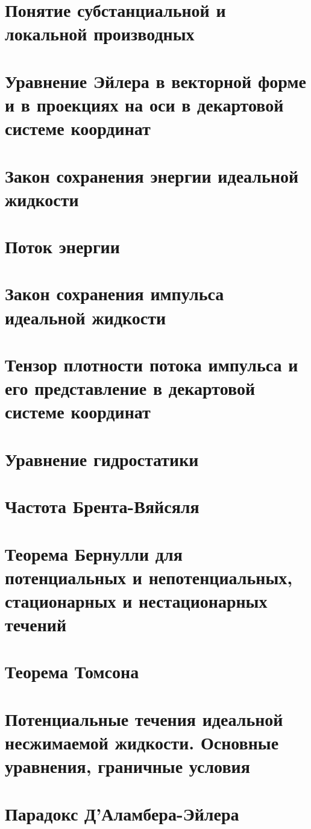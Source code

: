 \documentclass[10pt,landscape,a4paper]{article}
\begin{document}
	\small
	\begin{multicols*}{5}
		\section{Понятие субстанциальной и локальной производных}
		\section{Уравнение Эйлера в векторной форме и в проекциях на оси в декартовой системе координат}
		\section{Закон сохранения энергии идеальной жидкости}
		\section{Поток энергии}
		\section{Закон сохранения импульса идеальной жидкости}
		\section{Тензор плотности потока импульса и его представление в декартовой системе координат}
		\section{Уравнение гидростатики}
		\section{Частота Брента-Вяйсяля}
		\section{Теорема Бернулли для потенциальных и непотенциальных, стационарных и нестационарных течений}
		\section{Теорема Томсона}
		\section{Потенциальные течения идеальной несжимаемой жидкости. Основные уравнения, граничные условия}
		\section{Парадокс Д’Аламбера-Эйлера}

\end{multicols*}
\end{document}
